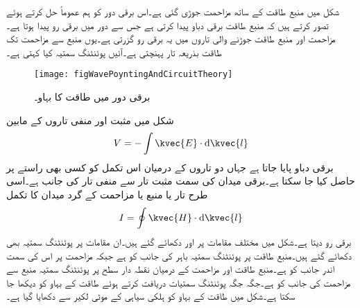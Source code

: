
شکل  میں منبع طاقت کے ساتھ مزاحمت  جوڑی گئی ہے۔اس برقی دور کو ہم عموماً حل کرتے ہوئے تصور کرتے ہیں کہ منبع طاقت برقی دباو  پیدا کرتی ہے جس سے  دور میں برقی رو  پیدا ہوتا ہے۔مزاحمت اور منبع طاقت جوڑنے والی تاروں میں یہ برقی رو گزرتی ہے۔یوں منبع سے مزاحمت تک  طاقت بذریعہ تار پہنچتی ہے۔آئیں پوئنٹنگ سمتیہ کیا کہتی ہے۔
\begin{figure}
\centering
\texttt{[image: figWavePoyntingAndCircuitTheory]}
\caption{برقی دور میں طاقت کا بہاو۔}
\label{شکل_مستوی_برقی_دور_طاقت_بہاو}
\end{figure}

شکل  میں مثبت اور منفی تاروں کے مابین
\begin{align}
V=-\int \kvec{E} \cdot \dif \kvec{l}
\end{align}
برقی دباو پایا جاتا ہے جہاں دو تاروں کے درمیان اس تکمل کو کسی بھی راستے پر حاصل کیا جا سکتا ہے۔برقی میدان  کی سمت مثبت تار سے منفی تار کی  جانب ہے۔اسی طرح تار یا منبع یا مزاحمت کے گرد میدان کا تکمل
\begin{align}
I=\oint \kvec{H} \cdot \dif \kvec{l}
\end{align}
برقی رو دیتا ہے۔شکل میں مختلف مقامات پر  اور  دکھائے گئے ہیں۔ان مقامات پر پوئنٹنگ سمتیہ  بھی دکھائے گئے ہیں۔منبع طاقت پر پوئنٹنگ سمتیہ باہر کی جانب کو ہے جبکہ مزاحمت پر اس کی سمت اندر جانب کو ہے۔منبع طاقت اور مزاحمت کے درمیان نقطہ دار سطح پر پوئنٹنگ سمتیہ منبع سے مزاحمت کی جانب کو ہے۔جگہ جگہ پوئنٹنگ سمتیات دریافت کرتے ہوئے طاقت کے بہاو کو دیکھا جا سکتا ہے۔شکل میں طاقت کے بہاو کو ہلکی سیاہی کے موٹی لکیر سے دکھایا گیا ہے۔

